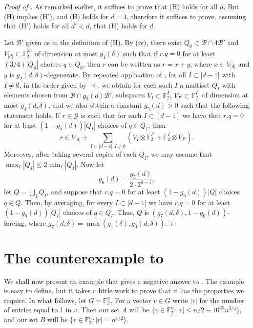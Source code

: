 \documentclass{toc}
\newcommand\F{\mathbb{F}}
\renewcommand\d{\delta}
\newcommand \cB{\mathcal B}
\newcommand \cG{\mathcal G}
\newcommand \s{\subset}
\begin{document}
\begin{proof}[Proof of ]
  As remarked earlier, it suffices to prove that (H) holds for all
  $d$. But (H) implies (H'), and (H) holds for $d=1$, therefore it
  suffices to prove, assuming that (H') holds for all $d'<d$, that (H)
  holds for $d$.
  
  Let $\cB'$ given as in the definition of (H). By
   (iv), there exist
  $Q_{\emptyset}\s \cB\cap 4\cB'$ and
  $V_{\lbrack d\rbrack}\s \F_2^{\lbrack d\rbrack}$ of dimension at
  most $g_1(\d)$ such that if $r.q=0$ for at least
  $({3}/{4})|Q_{\emptyset}|$ choices $q\in Q_{\emptyset}$, then $r$
  can be written as $r=x+y$, where $x\in V_{\lbrack d\rbrack}$ and $y$
  is $g_2(d,\d)$-degenerate. By repeated application of
  , for all $I\s \lbrack d-1\rbrack$ with
  $I\neq \emptyset$, in the order given by $\prec$, we obtain for each
  such $I$ a multiset $Q_{I}$ with elements chosen from
  $\cB\cap g_3(d)\cB'$, subspaces $V_I\s \F_2^{I}$,
  $V_{I^c}\s \F_2^{I^c}$ of dimension at most $g_4(d,\d)$, and we also
  obtain a constant $g_5(d)>0$ such that the following statement
  holds. If $r\in \cG$ is such that for each $I\subset[d-1]$ we have
  that $r.q=0$ for at least $(1-g_5(d))|Q_I|$ choices of $q\in Q_I$,
  then
  \[
    r\in V_{\lbrack d\rbrack}+\sum_{I\s \lbrack d-1\rbrack,I\neq \emptyset} (V_I\otimes \F_2^{I^c}+\F_2^{I}\otimes V_{I^c}).
  \]
  Moreover, after taking several copies of each $Q_I$, we may assume
  that $\max_I |Q_I|\leq 2\min_{I} |Q_I|$. Now let
  \[
    g_6(d)=\frac{g_5(d)}{2\cdot 2^{d-1}},
  \]
  let $Q=\bigcup_{I}Q_I$, and suppose that $r.q=0$ for at least
  $(1-g_6(d))|Q|$ choices $q\in Q$. Then, by averaging, for every
  $I\s \lbrack d-1\rbrack$ we have $r.q=0$ for at least
  $(1-g_5(d))|Q_I|$ choices of $q\in Q_I$. Thus, $Q$ is
  $(g_7(d,\d),1-g_6(d))$-forcing, where
  $g_7(d,\d)=\max(g_1(\d),g_4(d,\d))$.
\end{proof}

\section{The counterexample to }

We shall now present an example that gives a negative answer to . The example is easy to define, but it takes a little work to prove that it has the properties we require. In what follows, let $G=\F_2^n$. For a vector $v\in G$ write $|v|$ for the number of entries equal to 1 in $v$. Then our set $A$ will be $\{v\in \F_2^n:|v|\leq n/2-10^{20}n^{3/4}\}$, and our set $B$ will be $\{v\in \F_2^n:|v|=n^{1/2}\}$. 
\end{document}
